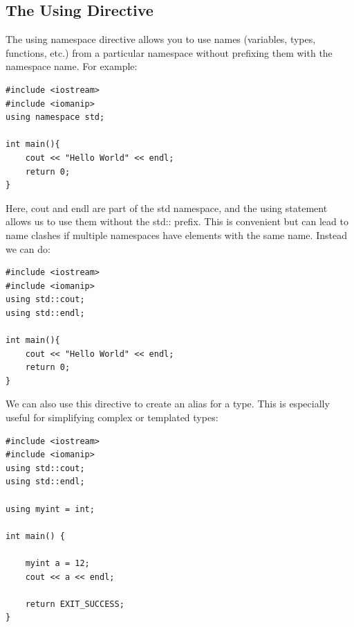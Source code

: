 \documentclass{report}
\begin{document}
    \subsection{The Using Directive}
    \bigbreak \noindent 
    The using namespace directive allows you to use names (variables, types, functions, etc.) from a particular namespace without prefixing them with the namespace name. For example:
    \bigbreak \noindent 
    \sepline
    \begin{verbatim}
#include <iostream>
#include <iomanip>
using namespace std;

int main(){
    cout << "Hello World" << endl;
    return 0;
}
    \end{verbatim}
    \sepline
    \bigbreak \noindent 
    Here, cout and endl are part of the std namespace, and the using statement allows us to use them without the std:: prefix. This is convenient but can lead to name clashes if multiple namespaces have elements with the same name. Instead we can do:
    \bigbreak \noindent 
    \sepline
    \begin{verbatim}
#include <iostream>
#include <iomanip>
using std::cout;
using std::endl;

int main(){
    cout << "Hello World" << endl;
    return 0;
}
    \end{verbatim}
    \sepline
    \bigbreak \noindent 
    We can also use this directive to create an alias for a type. This is especially useful for simplifying complex or templated types:
    \bigbreak \noindent 
    \sepline
    \begin{verbatim}
#include <iostream>
#include <iomanip>
using std::cout;
using std::endl;

using myint = int;

int main() {
    
    myint a = 12;
    cout << a << endl;

    return EXIT_SUCCESS;
}
    \end{verbatim}
    \sepline

    \pagebreak \bigbreak \noindent 
\end{document}
